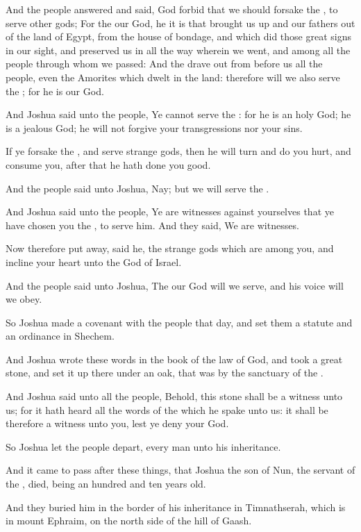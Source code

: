 \verse And the people answered and said, God forbid that we should forsake the \LORD, to serve other gods; \verse For the \LORD our God, he it is that brought us up and our fathers out of the land of Egypt, from the house of bondage, and which did those great signs in our sight, and preserved us in all the way wherein we went, and among all the people through whom we passed: \verse And the \LORD drave out from before us all the people, even the Amorites which dwelt in the land: therefore will we also serve the \LORD; for he is our God.

\verse And Joshua said unto the people, Ye cannot serve the \LORD: for he is an holy God; he is a jealous God; he will not forgive your transgressions nor your sins.

\verse If ye forsake the \LORD, and serve strange gods, then he will turn and do you hurt, and consume you, after that he hath done you good.

\verse And the people said unto Joshua, Nay; but we will serve the \LORD.

\verse And Joshua said unto the people, Ye are witnesses against yourselves that ye have chosen you the \LORD, to serve him. And they said, We are witnesses.

\verse Now therefore put away, said he, the strange gods which are among you, and incline your heart unto the \LORD God of Israel.

\verse And the people said unto Joshua, The \LORD our God will we serve, and his voice will we obey.

\verse So Joshua made a covenant with the people that day, and set them a statute and an ordinance in Shechem.

\verse And Joshua wrote these words in the book of the law of God, and took a great stone, and set it up there under an oak, that was by the sanctuary of the \LORD.

\verse And Joshua said unto all the people, Behold, this stone shall be a witness unto us; for it hath heard all the words of the \LORD which he spake unto us: it shall be therefore a witness unto you, lest ye deny your God.

\verse So Joshua let the people depart, every man unto his inheritance.

\verse And it came to pass after these things, that Joshua the son of Nun, the servant of the \LORD, died, being an hundred and ten years old.

\verse And they buried him in the border of his inheritance in Timnathserah, which is in mount Ephraim, on the north side of the hill of Gaash.

